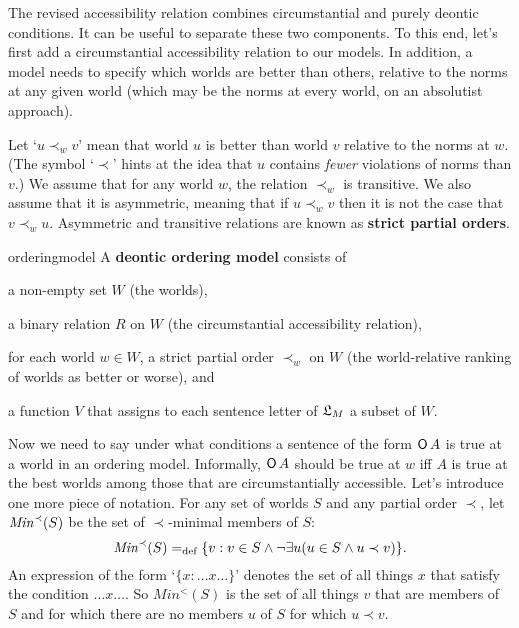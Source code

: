The revised accessibility relation combines circumstantial and purely deontic
conditions. It can be useful to separate these two components. To this end,
let's first add a circumstantial accessibility relation to our models. In
addition, a model needs to specify which worlds are better than others, relative
to the norms at any given world (which may be the norms at every world, on an
absolutist approach).

Let `$u \prec_w v$' mean that world $u$ is better than world $v$ relative to the
norms at $w$. (The symbol `$\prec$' hints at the idea that $u$ contains
\emph{fewer} violations of norms than $v$.) We assume that for any world $w$,
the relation $\prec_w$ is transitive. We also assume that it is asymmetric,
meaning that if $u \prec_w v$ then it is not the case that $v \prec_w u$.
Asymmetric and transitive relations are known as \textbf{strict partial orders}.

\begin{definition}{}{orderingmodel}
  A \textbf{deontic ordering model} consists of
  \vspace{-3mm}
  \begin{itemize*}
    \item a non-empty set $W$ (the worlds),
    \item a binary relation $R$ on $W$ (the circumstantial accessibility
    relation),
    \item for each world $w\in W$, a strict partial order $\prec_w$ on $W$ (the
    world-relative ranking of worlds as better or worse), and
    \item a function $V$ that assigns to each sentence letter of $\mathfrak{L}_M$ a subset
    of $W$.
  \end{itemize*}
\end{definition}

Now we need to say under what conditions a sentence of the form $\operatorname{\mathsf{O}} A$ is true
at a world in an ordering model. Informally, $\operatorname{\mathsf{O}} A$ should be true at $w$ iff
$A$ is true at the best worlds among those that are circumstantially accessible.
Let's introduce one more piece of notation. For any set of worlds $S$ and any
partial order $\prec$, let $\emph{Min}^{\prec}(S)$ be the set of $\prec$-minimal
members of $S$:
\[
  \emph{Min}^{\prec}(S) =_\text{def} \{ v: v \in S \land \neg\exists u(u \in S \land u \prec v) \}.
\]
An expression of the form `$\{ x: \ldots x \ldots \}$' denotes the set of all
things $x$ that satisfy the condition $\ldots x \ldots$. So $Min^{<}(S)$ is the
set of all things $v$ that are members of $S$ and for which there are no members
$u$ of $S$ for which $u \prec v$.

